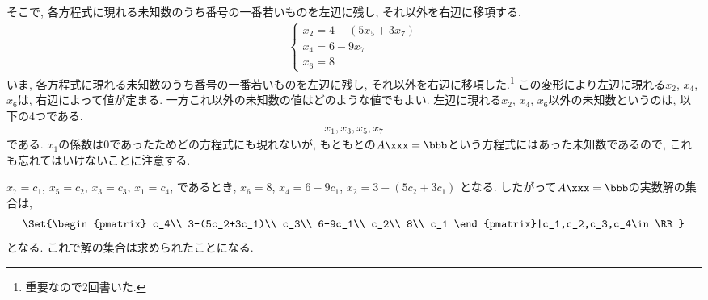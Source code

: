 そこで,
各方程式に現れる未知数のうち番号の一番若いものを左辺に残し,
それ以外を右辺に移項する.
\begin{align*}
  \begin{cases}
    x_2=4-(5x_5+3x_7)\\
    x_4=6-9x_7\\
    x_6=8
  \end{cases}
\end{align*}
いま,
各方程式に現れる未知数のうち番号の一番若いものを左辺に残し,
それ以外を右辺に移項した.\footnote{重要なので2回書いた.}
この変形により左辺に現れる$x_2$, $x_4$, $x_6$は,
右辺によって値が定まる.
一方これ以外の未知数の値はどのような値でもよい.
左辺に現れる$x_2$, $x_4$, $x_6$以外の未知数というのは,
以下の4つである.
\begin{align*}
  x_1,x_3,x_5,x_7
\end{align*}
である.
$x_1$の係数は$0$であったためどの方程式にも現れないが,
もともとの$A\xxx=\bbb$という方程式にはあった未知数であるので,
これも忘れてはいけないことに注意する.

$x_7=c_1$,
$x_5=c_2$,
$x_3=c_3$, 
$x_1=c_4$, 
であるとき,
$x_6=8$,
$x_4=6-9c_1$,
$x_2=3-(5c_2+3c_1)$
となる.
したがって$A\xxx=\bbb$の実数解の集合は,
\begin{align*}
  \Set{\begin{pmatrix}
      c_4\\
      3-(5c_2+3c_1)\\
      c_3\\
      6-9c_1\\
      c_2\\
      8\\
      c_1
    \end{pmatrix}|c_1,c_2,c_3,c_4\in\RR}
\end{align*}
となる.  これで解の集合は求められたことになる.

